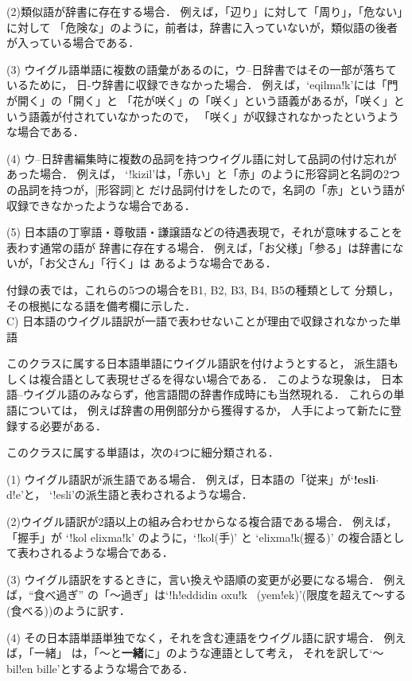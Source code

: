 {(2)類似語が辞書に存在する場合． 例えば，「辺り」に対して「周り」，「危ない」に対して
「危険な」のように，前者は，辞書に入っていないが，類似語の後者が入っている場合である．

(3) ウイグル語単語に複数の語彙があるのに，ウ--日辞書ではその一部が落ちているために，
日-ウ辞書に収録できなかった場合． 例えば，`eqilma!k'には「門が開く」の「開く」と
「花が咲く」の「咲く」という語義があるが，「咲く」という語義が付されていなかったので，
「咲く」が収録されなかったというような場合である．

(4) ウ--日辞書編集時に複数の品詞を持つウイグル語に対して品詞の付け忘れがあった場合． 例えば，
`!kizil'は，「赤い」と「赤」のように形容詞と名詞の2つの品詞を持つが，[形容詞]と
だけ品詞付けをしたので，名詞の「赤」という語が収録できなかったような場合である．

(5) 日本語の丁寧語・尊敬語・謙譲語などの待遇表現で，それが意味することを表わす通常の語が
辞書に存在する場合． 例えば，「お父様」「参る」は辞書にないが，「お父さん」「行く」は
あるような場合である．

付録\cite{JUDIC_APPENDIX}の表では，これらの5つの場合をB1, B2, B3, B4, B5の種類として
分類し，その根拠になる語を備考欄に示した．\\

C) 日本語のウイグル語訳が一語で表わせないことが理由で収録されなかった単語

このクラスに属する日本語単語にウイグル語訳を付けようとすると，
派生語もしくは複合語として表現せざるを得ない場合である．
このような現象は，
日本語--ウイグル語のみならず，他言語間の辞書作成時にも当然現れる．
これらの単語については，
例えば辞書の用例部分から獲得するか，
人手によって新たに登録する必要がある．

このクラスに属する単語は，次の4つに細分類される．

(1) ウイグル語訳が派生語である場合． 例えば，日本語の「従来」が`{\bf !esli}$\cdot$d!e'と，
`!esli'の派生語と表わされるような場合．

(2)ウイグル語訳が2語以上の組み合わせからなる複合語である場合． 例えば，「握手」が
`!kol elixma!k' のように，`!kol(手)' と 
`elixma!k(握る)' の複合語として表わされるような場合である．

(3) ウイグル語訳をするときに，言い換えや語順の変更が必要になる場合． 例えば，``食べ過ぎ''
の「〜過ぎ」は`!h!eddidin oxu!k ~(yem!ek)'(限度を超えて〜する(食べる))のように訳す．

(4) その日本語単語単独でなく，それを含む連語をウイグル語に訳す場合． 例えば，「一緒」
は，「〜と{\bf 一緒}に」のような連語として考え，
それを訳して`〜 bil!en bille'とするような場合である．

}
